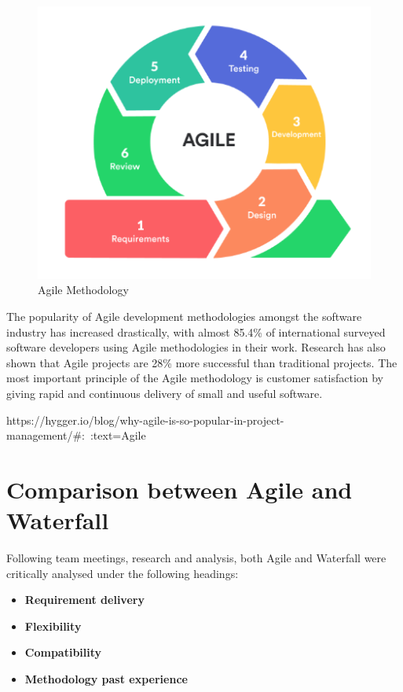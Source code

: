 \begin{figure}[ht]
    \centering
    \includegraphics[scale=0.8]{img/Agile.png}
    \caption{Agile Methodology}
    \label{fig:my_label1}
\end{figure}

The popularity of Agile development methodologies amongst the software industry has increased drastically, with almost 85.4\% of international surveyed software developers using Agile methodologies in their work. Research has also shown that Agile projects are 28\% more successful than traditional projects. The most important principle of the Agile methodology is customer satisfaction by giving rapid and continuous delivery of small and useful software.


https://hygger.io/blog/why-agile-is-so-popular-in-project-management/#:~:text=Agile%

\section{Comparison between Agile and Waterfall}
Following team meetings, research and analysis, both Agile and Waterfall were critically analysed under the following headings:

\begin{itemize}

    \item \textbf{Requirement delivery}

    \item \textbf{Flexibility}

    \item \textbf{Compatibility}

     \item \textbf{Methodology past experience}

\end{itemize}

